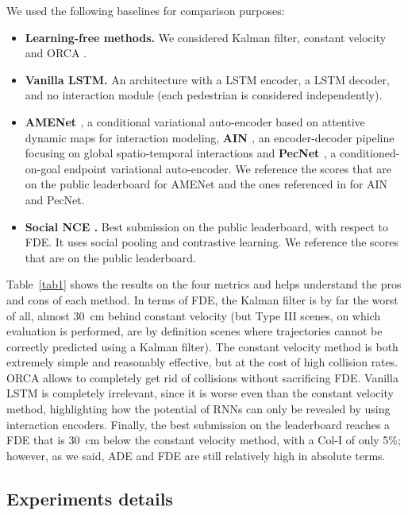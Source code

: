 \documentclass[conference]{IEEEtran}
\begin{document}
We used the following baselines for comparison purposes:
\begin{itemize}
    \item \textbf{Learning-free methods.} We considered Kalman filter, constant velocity \cite{scholler_what_2020} and ORCA \cite{orca}.
    \item \textbf{Vanilla LSTM.} An architecture with a LSTM encoder, a LSTM decoder, and no interaction module (each pedestrian is considered independently).
    \item \textbf{AMENet \cite{cheng2021amenet}}, a conditional variational auto-encoder based on attentive dynamic maps for interaction modeling, \textbf{AIN \cite{zhu2020robust}}, an encoder-decoder pipeline focusing on global spatio-temporal interactions and \textbf{PecNet \cite{mangalam2020not}}, a conditioned-on-goal endpoint variational auto-encoder. We reference the scores that are on the public leaderboard for AMENet and the ones referenced in \cite{kothari_human_2021} for AIN and PecNet.
    \item \textbf{Social NCE \cite{liu_social_2020}.} Best submission on the public leaderboard, with respect to FDE. It uses social pooling and contrastive learning. We reference the scores that are on the public leaderboard.
\end{itemize}

Table~\ref{tab1} shows the results on the four metrics and helps understand the pros and cons of each method. In terms of FDE, the Kalman filter is by far the worst of all, almost 30~cm behind constant velocity (but Type III scenes, on which evaluation is performed, are by definition scenes where trajectories cannot be correctly predicted using a Kalman filter). The constant velocity method is both extremely simple and reasonably effective, but at the cost of high collision rates. ORCA allows to completely get rid of collisions without sacrificing FDE. Vanilla LSTM is completely irrelevant, since it is worse even than
the constant velocity method, highlighting how the potential of RNNs can only be revealed by using interaction encoders. Finally, the best submission on the leaderboard reaches a FDE that is 30~cm below the constant velocity method, with a Col-I of only 5\%; however, as we said, ADE and FDE are still relatively high in absolute terms.


\subsection{Experiments details}
\end{document}
